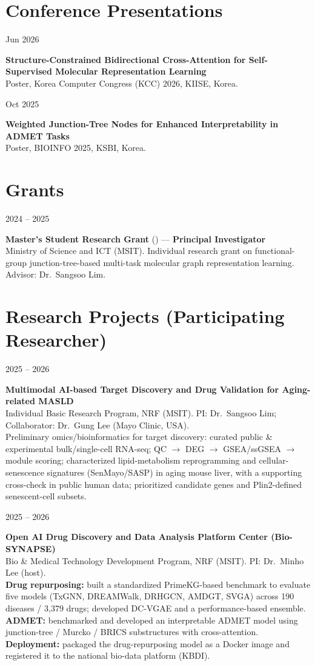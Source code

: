 \documentclass[10.5pt,a4paper]{article}
\newcommand{\entry}[2]{%
  \noindent
  \begin{minipage}[t]{0.16\linewidth}\raggedright{\small\color{muted}#1}\end{minipage}%
  \hspace{0.02\linewidth}%
  \begin{minipage}[t]{0.80\linewidth}\raggedright #2\end{minipage}%
  \par\vspace{3.5pt}%
}
\begin{document}
\section{Conference Presentations}
\entry{Jun 2026}{\textbf{Structure-Constrained Bidirectional Cross-Attention for Self-Supervised Molecular Representation Learning} \\ {\color{muted}Poster, Korea Computer Congress (KCC) 2026, KIISE, Korea.}}
\entry{Oct 2025}{\textbf{Weighted Junction-Tree Nodes for Enhanced Interpretability in ADMET Tasks} \\ {\color{muted}Poster, BIOINFO 2025, KSBI, Korea.}}

\section{Grants}
\entry{2024 -- 2025}{\textbf{Master's Student Research Grant} (\kr{석사과정생 연구장려금지원사업}) --- \textbf{Principal Investigator} \\ {\color{muted}Ministry of Science and ICT (MSIT). Individual research grant on functional-group junction-tree-based multi-task molecular graph representation learning. Advisor: Dr.\ Sangsoo Lim.}}

\section{Research Projects (Participating Researcher)}
\entry{2025 -- 2026}{\textbf{Multimodal AI-based Target Discovery and Drug Validation for Aging-related MASLD} \\ {\color{muted}Individual Basic Research Program, NRF (MSIT). PI: Dr.\ Sangsoo Lim; Collaborator: Dr.\ Gung Lee (Mayo Clinic, USA).} \\ {\color{muted}Preliminary omics/bioinformatics for target discovery: curated public \& experimental bulk/single-cell RNA-seq; QC $\rightarrow$ DEG $\rightarrow$ GSEA/ssGSEA $\rightarrow$ module scoring; characterized lipid-metabolism reprogramming and cellular-senescence signatures (SenMayo/SASP) in aging mouse liver, with a supporting cross-check in public human data; prioritized candidate genes and Plin2-defined senescent-cell subsets.}}
\entry{2025 -- 2026}{\textbf{Open AI Drug Discovery and Data Analysis Platform Center (Bio-SYNAPSE)} \\ {\color{muted}Bio \& Medical Technology Development Program, NRF (MSIT). PI: Dr.\ Minho Lee (host).} \\ {\color{muted}\textbf{Drug repurposing:} built a standardized PrimeKG-based benchmark to evaluate five models (TxGNN, DREAMWalk, DRHGCN, AMDGT, SVGA) across 190 diseases / 3{,}379 drugs; developed DC-VGAE and a performance-based ensemble. \textbf{ADMET:} benchmarked and developed an interpretable ADMET model using junction-tree / Murcko / BRICS substructures with cross-attention. \textbf{Deployment:} packaged the drug-repurposing model as a Docker image and registered it to the national bio-data platform (KBDI).}}
\end{document}
